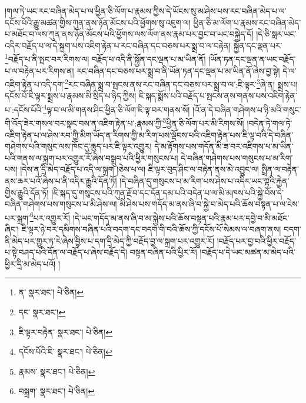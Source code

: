 །གལ་ཏེ་ཡང་རང་བཞིན་མེད་པ་ལ་ཕྱིན་ཅི་ལོག་པ་རྣམས་ཀྱིས་དེ་ཡོངས་སུ་མ་ཤེས་པས་རང་བཞིན་མེད་པ་ལ་དངོས་པོའི་རྒྱུ་མཚན་གྱིས་ཀུན་ནས་ཉོན་མོངས་པའི་ཕྱོགས་སུ་འཇུག་ལ། ཕྱིན་ཅི་མ་ལོག་པ་རྣམས་རང་བཞིན་མེད་པ་མཐོང་བ་ལས་ཀུན་ནས་ཉོན་མོངས་པའི་ཕྱོགས་ལས་ལོག་ནས་རྣམ་པར་བྱང་བ་ཡང་བསྐྱེད་དོ། །དེ་ཅི་སླར་ཡང་འདིར་བརྗོད་པ་ལ་དེ་སྐྲག་པས་འཇིག་རྟེན་པ་རང་བཞིན་དང་བཅས་པར་སྨྲ་བ་ལ་བརྟེན། སྐྱོན་དང་ལྡན་པར་\footnote{ན་  སྣར་ཐང་།  པེ་ཅིན། }བརྗོད་པ་ནི་སྤང་བར་རིགས་ལ། བརྗོད་པ་འདི་ནི་སྐྱོན་དང་ལྡན་པ་མ་ཡིན་ནོ། །ཡོན་ཏན་དང་ལྡན་ན་ཡང་བརྗོད་པ་ལ་བརྟེན་པར་རིགས་ན། རང་བཞིན་དང་བཅས་པར་སྨྲ་བ་ནི་ཡོན་ཏན་དང་ལྡན་པ་མ་ཡིན་ནོ་ཞེས་བྱ་སྟེ། དེ་ལ་འཇིག་རྟེན་པ་འདི་དག་\footnote{དང་  སྣར་ཐང་། }རང་བཞིན་སྨྲ་བ་སྤངས་ནས་རང་བཞིན་དང་བཅས་པར་སྨྲ་བ་ལ་:ཇི་ལྟར་\footnote{ཇི་ལྟར་བརྟེན་  སྣར་ཐང་།  པེ་ཅིན། }ཞེ་ན། སྨྲས་པ། དངོས་པོ་ཇི་ལྟར་སྨྲས་པ་རྣམས་མི་སྲིད་པ་ཉིད་ཀྱིས། ཇི་སྐད་སྨོས་པའི་བརྗོད་པ་སྤངས་ནས་གནས་པས་འཇིག་རྟེན་པ་:དངོས་པོའི་\footnote{དངོས་པོའི་ཇི་  སྣར་ཐང་།  པེ་ཅིན། }ལྟ་བ་ལ་མི་གནས་ཤིང་ཕྱིན་ཅི་ལོག་ཇི་ལྟ་བར་གནས་སོ། །འོ་ན་དེ་བཞིན་གཤེགས་པ་ཉི་མའི་གསུང་གི་འོད་ཟེར་གསལ་བར་སྣང་བས་ན་འཇིག་རྟེན་པ་:རྣམས་ཀྱི་\footnote{རྣམས་  སྣར་ཐང་།  པེ་ཅིན། }ཕྱིན་ཅི་ལོག་པར་མི་རིགས་སོ། །བདེན་ཏེ་གལ་ཏེ་འཇིག་རྟེན་པ་ལ་ཤེས་རབ་ཀྱི་མིག་ཡོད་ན་རིགས་ཀྱི་མ་རིག་པས་ལྡོངས་པའི་འཇིག་རྟེན་པས་ཇི་ལྟ་བའི་དེ་བཞིན་གཤེགས་པའི་གསུང་ལས་ཁོང་དུ་ཆུད་པར་ཇི་ལྟར་འགྱུར། དེ་མ་རྟོགས་པས་གདོན་མི་ཟ་བར་འཇིགས་པ་མ་ཡིན་པའི་གནས་ལ་སྐྲག་པར་འགྱུར་རོ་ཞེས་བསྒྲུབ་པའི་ཕྱིར་གསུངས་པ། དེ་བཞིན་གཤེགས་པས་གསུངས་པ་མ་རིག་པས། །དེས་ན་དྲི་མེད་བརྗོད་པ་འདི་ལ་སྐྲག །ཅེས་པ་ལ། ཇི་ལྟར་བུད་ཤིང་ལ་བརྟེན་ནས་མེ་འབྱུང་ལ། སྤྲིན་ལ་བརྟེན་ནས་ཆར་པའོ་ཞེས་པ་ནི་འདིར་རྒྱུའི་དོན་ཏོ། །དེ་བཞིན་དུ་གསུངས་པ་མ་རིག་པས་ཤེས་པ་འདིར་ཡང་ཀྟའི་རྐྱེན་གྱིས་རྒྱུའི་དོན་ཏོ། །ཇི་སྐད་དུ་གསུངས་པའི་ཀུན་རྫོབ་དང་དོན་དམ་པའི་བདེན་པ་ལ་མི་མཁས་པའི་སྐྱེ་བོས་དེ་བཞིན་གཤེགས་པས་གསུངས་པ་མི་ཤེས་ལ། མི་ཤེས་པས་གདོད་མ་ནས་ཞི་བ་སྐྱེ་བ་མེད་པའི་ཆོས་བསྟན་པ་ལ་ངེས་པར་སྐྲག་\footnote{བསྐྲག་  སྣར་ཐང་།  པེ་ཅིན། }པར་འགྱུར་རོ། །དེ་ཡང་གདོད་མ་ནས་ཞི་བ་མ་སྐྱེས་པའི་ཆོས་བསྟན་པའི་རྣམ་པར་དབྱེ་བ་མི་མཐོང་ཞིང་། ཇི་ལྟར་ཉེ་བར་དམིགས་བཞིན་པའི་བདག་དང་བདག་གི་བའི་ཆོས་ཀྱི་དངོས་པོ་སེམས་ལ་བཞག་ནས། བདག་ནི་མེད་པར་གྱུར་ཏ་རེ་ཞེས་བྱིས་པ་དག་དྲི་མེད་ཀྱི་བརྗོད་བྱ་ལ་སྐྲག་པར་འགྱུར་རོ། །བརྗོད་པར་བྱ་བའི་ཕྱིར་བརྗོད་པ་སྟེ་བཤད་པའི་དོན་ལ་བརྗོད་པ་ཞེས་བརྗོད་དེ། བསྟན་བཞིན་པའི་ཕྱིར་རོ། །བརྗོད་པ་དེ་ཡང་མཚན་མ་མེད་པའི་ཕྱིར་དྲི་མ་མེད་པའོ། །

